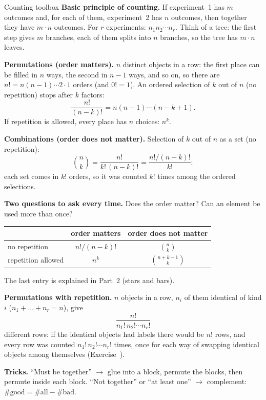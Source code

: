 \begin{key}{Counting toolbox}
	\textbf{Basic principle of counting.} If experiment~1 has $m$ outcomes and,
	for each of them, experiment~2 has $n$ outcomes, then together they have
	$m\cdot n$ outcomes. For $r$ experiments: $n_1n_2\cdots n_r$. Think of a
	tree: the first step gives $m$ branches, each of them splits into $n$
	branches, so the tree has $m\cdot n$ leaves.

	\textbf{Permutations (order matters).} $n$ distinct objects in a row: the
	first place can be filled in $n$ ways, the second in $n-1$ ways, and so
	on, so there are $n! = n(n-1)\cdots 2\cdot1$ orders (and $0!=1$). An
	ordered selection of $k$ out of $n$ (no repetition) stops after $k$
	factors:
	\[ \frac{n!}{(n-k)!}=n(n-1)\cdots(n-k+1). \]
	If repetition is allowed, every place has $n$ choices: $n^k$.

	\textbf{Combinations (order does not matter).} Selection of $k$ out of $n$
	as a set (no repetition):
	\[ \binom nk=\frac{n!}{k!\,(n-k)!}=\frac{n!/(n-k)!}{k!}: \]
	each set comes in $k!$ orders, so it was counted $k!$ times among the
	ordered selections.

	\textbf{Two questions to ask every time.} Does the order matter? Can an
	element be used more than once?
	\begin{center}
		\begin{tabular}{lcc}
			\toprule
			                   & order matters & order does not matter \\\midrule
			no repetition      & $n!/(n-k)!$   & $\binom nk$           \\
			repetition allowed & $n^k$         & $\binom{n+k-1}{k}$    \\\bottomrule
		\end{tabular}
	\end{center}
	The last entry is explained in Part~2 (stars and bars).

	\textbf{Permutations with repetition.} $n$ objects in a row, $n_i$ of them
	identical of kind $i$ ($n_1+\dots+n_r=n$), give
	\[ \frac{n!}{n_1!\,n_2!\cdots n_r!} \]
	different rows: if the identical objects had labels there would be $n!$
	rows, and every row was counted $n_1!\,n_2!\cdots n_r!$ times, once for
	each way of swapping identical objects among themselves
	(Exercise~).

	\textbf{Tricks.} ``Must be together'' $\to$ glue into a block, permute the
	blocks, then permute inside each block. ``Not together'' or ``at least
	one'' $\to$ complement: $\#\text{good}=\#\text{all}-\#\text{bad}$.
\end{key}

